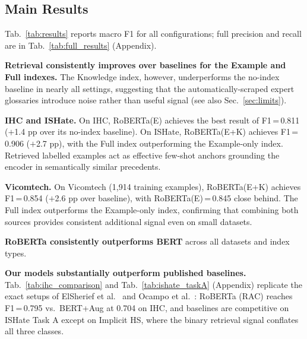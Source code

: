 \documentclass{article}
\begin{document}
\subsection{Main Results}
Tab.~\ref{tab:results} reports macro F1 for all configurations; full precision and recall are in Tab.~\ref{tab:full_results} (Appendix).

\textbf{Retrieval consistently improves over baselines for the Example and Full indexes.} The Knowledge index, however, underperforms the no-index baseline in nearly all settings, suggesting that the automatically-scraped expert glossaries introduce noise rather than useful signal (see also Sec.~\ref{sec:limits}).

\textbf{IHC and ISHate.} On IHC, RoBERTa(E) achieves the best result of F1\,=\,0.811 ($+$1.4 pp over its no-index baseline). On ISHate, RoBERTa(E+K) achieves F1\,=\,0.906 ($+$2.7 pp), with the Full index outperforming the Example-only index. Retrieved labelled examples act as effective few-shot anchors grounding the encoder in semantically similar precedents.

\textbf{Vicomtech.} On Vicomtech (1,914 training examples), RoBERTa(E+K) achieves F1\,=\,0.854 ($+$2.6 pp over baseline), with RoBERTa(E)\,=\,0.845 close behind. The Full index outperforms the Example-only index, confirming that combining both sources provides consistent additional signal even on small datasets.

\textbf{RoBERTa consistently outperforms BERT} across all datasets and index types.

\textbf{Our models substantially outperform published baselines.} Tab.~\ref{tab:ihc_comparison} and Tab.~\ref{tab:ishate_taskA} (Appendix) replicate the exact setups of ElSherief et al.~\cite{elsherief2021latent} and Ocampo et al.~\cite{ocampo2023indepth}: RoBERTa (RAC) reaches F1\,=\,0.795 vs.\ BERT+Aug at 0.704 on IHC, and baselines are competitive on ISHate Task A except on Implicit HS, where the binary retrieval signal conflates all three classes.
\end{document}

